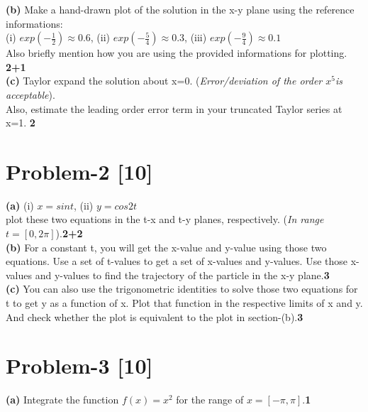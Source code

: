 \documentclass[12pt, a4paper]{article}
\begin{document}
\noindent
\textbf{(b)} Make a hand-drawn plot of the solution in the x-y plane using the reference informations:\\
(i) $exp(-\frac{1}{2})\approx 0.6$, (ii) $exp(-\frac{5}{4})\approx 0.3$, (iii) $exp(-\frac{9}{4})\approx 0.1$\\
Also briefly mention how you are using the provided informations for plotting. \hfill\textbf{2+1}\\

\noindent
\textbf{(c)} Taylor expand the solution about x=0. (\textit{Error/deviation of the order $x^5$is acceptable}).\\
Also, estimate the leading order error term in your truncated Taylor series at x=1. \hfill \textbf{2}

\section*{Problem-2 \hfill \textbf{[10]}}
\textbf{(a)} (i) $x=sint$, (ii) $y=cos2t$\\ 
plot these two equations in the t-x and t-y planes, respectively. (\textit{In range $t=[0, 2\pi]$}).\hfill \textbf{2+2}\\

\noindent
\textbf{(b)} For a constant t, you will get the x-value and y-value using those two equations.
Use a set of t-values to get a set of x-values and y-values. 
Use those x-values and y-values to find the trajectory of the particle in the x-y plane.\hfill\textbf{3}\\

\noindent
\textbf{(c)} You can also use the trigonometric identities to solve those two equations for t 
to get y as a function of x. Plot that function in the respective limits of x and y.
And check whether the plot is equivalent to the plot in section-(b).\hfill\textbf{3}

\section*{Problem-3 \hfill \textbf{[10]}}

\textbf{(a)} Integrate the function $f(x) = x^2$ for the range of $x=[-\pi, \pi]$.\hfill\textbf{1}\\
\end{document}

